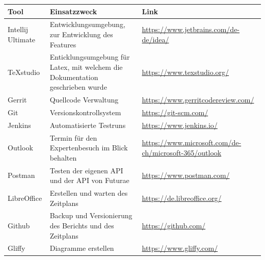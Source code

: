 \renewcommand{\arraystretch}{1.5}
\begin{longtable}{|p{}|p{}|p{}|}
    \hline
    \textbf{Tool} & \textbf{Einsatzzweck} & \textbf{Link} \\ \hline
    Intellij Ultimate           & Entwicklungsumgebung, zur Entwicklung des Features                   & \url{https://www.jetbrains.com/de-de/idea/}     \\ \hline
    TeXstudio           & Enticklungsumgebung für Latex, mit welchem die Dokumentation geschrieben wurde & \url{https://www.texstudio.org/}     \\ \hline
    Gerrit           & Quellcode Verwaltung & \url{https://www.gerritcodereview.com/}     \\ \hline
    Git          & Versionskontrollsystem & \url{https://git-scm.com/}     \\ \hline
    Jenkins & Automatisierte Testruns  & \url{https://www.jenkins.io/}     \\ \hline
    Outlook & Termin für den Expertenbesuch im Blick behalten& \url{https://www.microsoft.com/de-ch/microsoft-365/outlook} \\ \hline
    Postman & Testen der eigenen API und der API von Futurae & \url{https://www.postman.com/} \\ \hline
    LibreOffice & Erstellen und warten des Zeitplans & \url{https://de.libreoffice.org/} \\ \hline
    Github & Backup und Versionierung des Berichts und des Zeitplans & \url{https://github.com/} \\ \hline
    Gliffy & Diagramme erstellen & \url{https://www.gliffy.com/} \\ \hline
    
\end{longtable}
\renewcommand{\arraystretch}{1}
\newpage